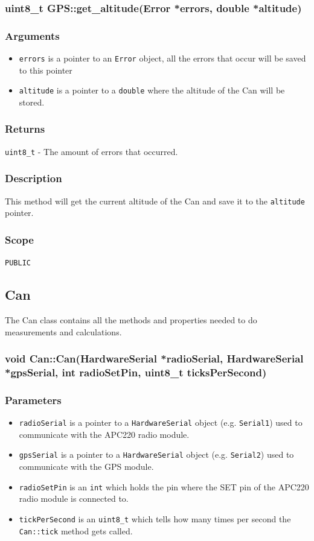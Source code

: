 \documentclass[a4paper,10pt]{article}
\newcommand{\errorsarg}{\item \texttt{errors} is a pointer to an \texttt{Error} object, all the errors that occur will be saved to this pointer}
\newcommand{\amountoferrorsret}{\texttt{uint8\_t} - The amount of errors that occurred. }
\newcommand{\func}[1]{\texttt{#1}}
\newenvironment{method}[2]{%
	\newcommand\funname{\func{#1}}
	\subsubsection[#1]{#2}
	
	\newenvironment{methodargs}{%
		\subsubsection*{Arguments}
	}{}
	
	\newenvironment{methodreturns}{%
		\subsubsection*{Returns}
	}{}
	
	\newenvironment{methoddesc}{%
		\subsubsection*{Description}
	}{}

	\newenvironment{methodscope}{
		\subsubsection*{Scope}
	}{}
}{}
\begin{document}
			\begin{method}{get\_altitude}{uint8\_t GPS::get\_altitude(Error *errors, double *altitude)}
				\begin{methodargs}
					\begin{itemize}
						\errorsarg
						\item \texttt{altitude} is a pointer to a \texttt{double} where the altitude of the Can will be stored. 
					\end{itemize}
				\end{methodargs}
		
				\begin{methodreturns}
					\amountoferrorsret
				\end{methodreturns}
				
				\begin{methoddesc}
					This method will get the current altitude of the Can and save it to the \texttt{altitude} pointer. 
				\end{methoddesc}
			
				\begin{methodscope}
					\texttt{PUBLIC}
				\end{methodscope}
			\end{method}
			
			
			\vspace{3ex}
	
		\subsection{Can}
			The Can class contains all the methods and properties needed to do measurements and calculations. 
			
			\subsubsection[Can]{void Can::Can(HardwareSerial *radioSerial, HardwareSerial *gpsSerial, int radioSetPin, uint8\_t ticksPerSecond)}
				\subsubsection*{Parameters}
					\begin{itemize}
						\item \texttt{radioSerial} is a pointer to a \texttt{HardwareSerial} object (e.g. \texttt{Serial1}) used to communicate with the APC220 radio module. 
						\item \texttt{gpsSerial} is a pointer to a \texttt{HardwareSerial} object (e.g. \texttt{Serial2}) used to communicate with the GPS module. 
						\item \texttt{radioSetPin} is an \texttt{int} which holds the pin where the SET pin of the APC220 radio module is connected to. 
						\item \texttt{tickPerSecond} is an \texttt{uint8\_t} which tells how many times per second the \texttt{Can::tick} method gets called. 
					\end{itemize}
				
\end{document}
